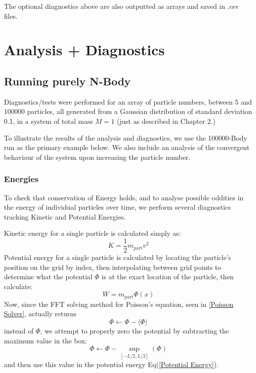 \documentclass[oneside]{book}
\begin{document}
The optional diagnostics above are also outputted as arrays and saved in .csv files.

\chapter{Analysis + Diagnostics}

\section{Running purely N-Body}
Diagnostics/tests were performed for an array of particle numbers, between 5 and 100000 particles, all generated from a Gaussian distribution of standard deviation 0.1, in a system of total mass $M=1$ (just as described in Chapter 2.)

To illustrate the results of the analysis and diagnostics,  we use the 100000-Body run as the primary example below. We also include an analysis of the convergent behaviour of the system upon increasing the particle number.

\subsection{Energies}
To check that conservation of Energy holds, and to analyse possible oddities in the energy of individual particles over time, we perform several diagnostics tracking Kinetic and Potential Energies.

Kinetic energy for a single particle is calculated simply as:
\begin{equation}
    K = \frac{1}{2}m_\text{part} v^2
\end{equation}
Potential energy for a single particle is calculated by locating the particle's position on the grid by index, then interpolating between grid points to determine what the potential $\Phi$ is at the exact location of the particle, then calculate:
\begin{equation}
    W = m_\text{part}\Phi(x)    
    \label{Potential Energy}
\end{equation}
Now, since the FFT solving method for Poisson's equation, seen in \cref{Poisson Solver}, actually returns
$$\Phi \leftarrow \Phi - \langle\Phi\rangle$$
instead of $\Phi$, we attempt to properly zero the potential by subtracting the maximum value in the box:
$$\Phi \leftarrow \Phi - \sup_{[-L/2,L/2]}(\Phi)$$
and then use this value in the potential energy Eq(\ref{Potential Energy}). 
\end{document}

